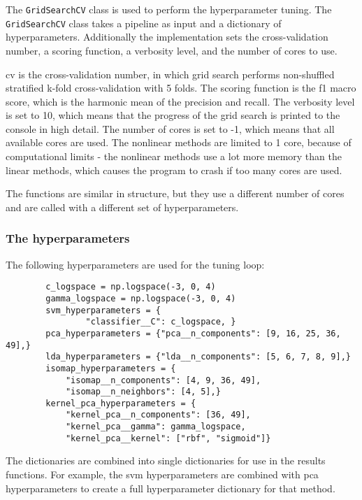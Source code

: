 The \texttt{GridSearchCV} class is used to perform the hyperparameter tuning. The \texttt{GridSearchCV} class takes a pipeline as input and a dictionary of hyperparameters. Additionally the implementation sets the cross-validation number, a scoring function, a verbosity level, and the number of cores to use.

cv is the cross-validation number, in which grid search performs non-shuffled stratified k-fold cross-validation with 5 folds. The scoring function is the f1 macro score, which is the harmonic mean of the precision and recall. The verbosity level is set to 10, which means that the progress of the grid search is printed to the console in high detail. The number of cores is set to -1, which means that all available cores are used. The nonlinear methods are limited to 1 core, because of computational limits - the nonlinear methods use a lot more memory than the linear methods, which causes the program to crash if too many cores are used.


The functions are similar in structure, but they use a different number of cores and are called with a different set of hyperparameters.

\subsubsection{The hyperparameters}\label{subsubsec:the-hyperparameters}
The following hyperparameters are used for the tuning loop:


\begin{listing}[htb!]
    \centering
    \begin{verbatim}
        c_logspace = np.logspace(-3, 0, 4)
        gamma_logspace = np.logspace(-3, 0, 4)
        svm_hyperparameters = {
                "classifier__C": c_logspace, }
        pca_hyperparameters = {"pca__n_components": [9, 16, 25, 36, 49],}
        lda_hyperparameters = {"lda__n_components": [5, 6, 7, 8, 9],}
        isomap_hyperparameters = {
            "isomap__n_components": [4, 9, 36, 49],
            "isomap__n_neighbors": [4, 5],}
        kernel_pca_hyperparameters = {
            "kernel_pca__n_components": [36, 49],
            "kernel_pca__gamma": gamma_logspace,
            "kernel_pca__kernel": ["rbf", "sigmoid"]}
    \end{verbatim}
    \caption{}
    \label{lst:hyperparameters-dictionaries}
\end{listing}


The dictionaries are combined into single dictionaries for use in the results functions. For example, the svm hyperparameters are combined with pca hyperparameters to create a full hyperparameter dictionary for that method.

